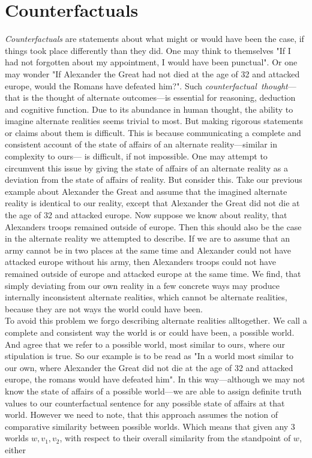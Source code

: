 \documentclass[a4paper,american]{paper}
\theoremstyle{definition}\newtheorem{definition}{Definition}
\begin{document}
\section{Counterfactuals}
\textit{Counterfactuals} are statements about what might or would have been the case, if things took place differently than they did. One may think to themselves "If I had not forgotten about my appointment, I would have been punctual". Or one may wonder "If Alexander the Great had not died at the age of 32 and attacked europe, would the Romans have defeated him?". Such \textit{counterfactual~thought}---that is the thought of alternate outcomes---is essential for reasoning, deduction and cognitive function. \cite{byrne_counterfactual_2016} Due to its abundance in human thought, the ability to imagine alternate realities seems trivial to most. But making rigorous statements or claims about them is difficult. This is because communicating a complete and consistent account of the state of affairs of an alternate reality---similar in complexity to ours--- is difficult, if not impossible. One may attempt to circumvent this issue by giving the state of affairs of an alternate reality as a deviation from the state of affairs of reality. But consider this. 
Take our previous example about Alexander the Great and assume that the imagined alternate reality is identical to our reality, except that Alexander the Great did not die at the age of 32 and attacked europe. Now suppose we know about reality, that Alexanders troops remained outside of europe. Then this should also be the case in the alternate reality we attempted to describe. If we are to assume that an army cannot be in two places at the same time and Alexander could not have attacked europe without his army, then Alexanders troops could not have remained outside of europe and attacked europe at the same time.
We find, that simply deviating from our own reality in a few concrete ways may produce internally inconsistent alternate realities, which cannot be alternate realities, because they are not ways the world could have been.\\
To avoid this problem we forgo describing alternate realities alltogether. We call a complete and consistent way the world is or could have been, a possible world. And agree that we refer to a possible world, most similar to ours, where our stipulation is true. So our example is to be read as "In a world most similar to our own, where Alexander the Great did not die at the age of 32 and attacked europe, the romans would have defeated him". In this way---although we may not know the state of affairs of a possible world---we are able to assign definite truth values to our counterfactual sentence for any possible state of affairs at that world. However we need to note, that this approach assumes the notion of comparative similarity between possible worlds. Which means that given any 3 worlds $w,v_1,v_2$, with respect to their overall similarity from the standpoint of $w$, either
\end{document}
